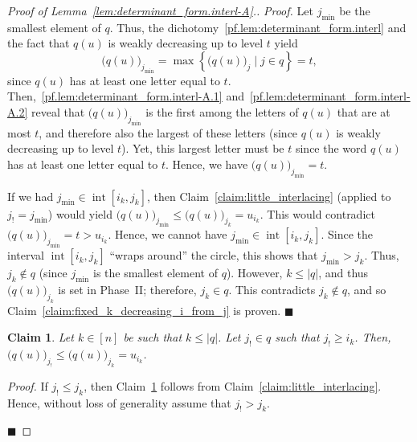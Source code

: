 \documentclass[reqno]{amsart}
\newcommand{\0}{\phantom{c}}
\DeclareMathOperator{\inter}{int} %
\newenvironment{subproof}{\textit{Proof.} }{\hfill$\blacksquare$ \medskip}
\newenvironment{verlong}{}{}
\newenvironment{vershort}{}{}
\newcommand{\set}[1]{\left\{ #1 \right\}}
\newcommand{\abs}[1]{\left| #1 \right|}
\newcommand{\ive}[1]{\left[ #1 \right]}
\theoremstyle{plain}
\newtheorem{claim}[thm]{Claim}
\theoremstyle{definition}
\numberwithin{equation}{section}
\begin{document}
\begin{proof}[Proof of Lemma~\ref{lem:determinant_form.interl-A}.]
\begin{subproof}
Let $j_{\min}$ be the smallest element of $q$.
\begin{vershort}
Thus, the dichotomy~\eqref{pf.lem:determinant_form.interl} and the fact that $q(u)$ is weakly decreasing up to level $t$ yield
\[
\bigl( q(u) \bigr)_{j_{\min}} = \max \set{\bigl( q(u) \bigr)_j \mid j \in q} = t ,
\]
since $q(u)$ has at least one letter equal to $t$.
\end{vershort}
\begin{verlong}
Then,~\eqref{pf.lem:determinant_form.interl-A.1} and~\eqref{pf.lem:determinant_form.interl-A.2} reveal that $\bigl( q(u) \bigr)_{j_{\min}}$ is the first among the letters of $q(u)$ that are at most $t$, and therefore also the largest of these letters (since $q(u)$ is weakly decreasing up to level $t$).
Yet, this largest letter must be $t$ since the word $q(u)$ has at least one letter equal to $t$.
Hence, we have $\bigl( q(u) \bigr)_{j_{\min}} = t$.
\end{verlong}

If we had $j_{\min} \in \inter[i_k, j_k]$, then Claim~\ref{claim:little_interlacing} (applied to $j_{!} = j_{\min}$) would yield $\bigl( q(u) \bigr)_{j_{\min}} \leq \bigl( q(u) \bigr)_{j_k} = u_{i_k}$.
This would contradict $\bigl( q(u) \bigr)_{j_{\min}} = t > u_{i_k}$.
Hence, we cannot have $j_{\min} \in \inter[i_k, j_k]$.
Since the interval $\inter[i_k, j_k]$ ``wraps around'' the circle, this shows that $j_{\min} > j_k$.
Thus, $j_k\notin q$ (since $j_{\min}$ is the smallest element of $q$).
However, $k \leq \abs{q}$, and thus $\bigl( q(u) \bigr)_{j_k}$ is set in Phase~II; therefore, $j_k\in q$.
This contradicts $j_k\notin q$, and so Claim~\ref{claim:fixed_k_decreasing_i_from_j} is proven.
\end{subproof}

\begin{claim}
\label{claim:smaller_site_jbang}
Let $k\in \ive{n} $ be such that $k \leq \abs{q}$.
Let $j_{!} \in q$ such that $j_{!} \geq i_k$.
Then, $\bigl( q(u) \bigr)_{j_{!}} \leq \bigl( q(u) \bigr)_{j_k} = u_{i_k}$.
\end{claim}

\begin{subproof}
If $j_{!}\leq j_k$, then Claim~\ref{claim:smaller_site_jbang} follows from Claim~\ref{claim:little_interlacing}.
Hence, without loss of generality assume that $j_{!} > j_k$.


\end{subproof}
\end{proof}
\end{document}
